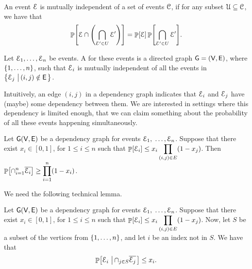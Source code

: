 \begin{defn}
    An event $\EuScript{E}$ is mutually independent of a set of events
    $\EuScript{C}$, if for any subset $\EuScript{U} \subseteq
    \EuScript{C}$, we have that
    \[
    \Prob{\Event \cap \pth{\bigcap_{\Event' \in U} \Event'}}
    =\Prob{\Event } \Prob{\bigcap_{\Event' \in U} \Event'}.
    \]
     

    Let $\EuScript{E}_1, \ldots, \EuScript{E}_n$ be events. A  for these events is a directed graph
    $\mathsf{G}=(\mathsf{V},\mathsf{E})$, where $\left\{ {1,\ldots, n} \right\}$, such that
    $\EuScript{E}_i$ is mutually independent of all the events in $\left\{ {
       \EuScript{E}_j \,\left|\, { (i,j) \notin \mathsf{E}} \bigr.\right.} \right\}$.
\end{defn}

Intuitively, an edge $(i,j)$ in a dependency graph indicates that
$\EuScript{E}_i$ and $\EuScript{E}_j$ have (maybe) some dependency between them.  We are
interested in settings where this dependency is limited enough, that
we can claim something about the probability of all these events
happening simultaneously.

\begin{lemma}%
    Let $\mathsf{G}(\mathsf{V},\mathsf{E})$ be a dependency graph for events
    $\EuScript{E}_1,$ $\ldots, \EuScript{E}_n$. Suppose that there exist $x_i \in
    [0,1]$, for $1 \leq i \leq n$ such that $\ds \Prob{\Event_i} \leq
    x_i \prod_{(i,j) \in E} \pth{1-x_j}$.  Then $\ds
    \Prob{\cap_{i=1}^{n} \overline{\Event_i}} \geq \prod_{i=1}^{n}
    \pth{1-x_i}$.
\end{lemma}

We need the following technical lemma.

\begin{lemma}
    Let $\mathsf{G}(\mathsf{V},\mathsf{E})$ be a dependency graph for events
    $\EuScript{E}_1,$ $\ldots, \EuScript{E}_n$. Suppose that there exist $x_i \in
    [0,1]$, for $1 \leq i \leq n$ such that $\ds \Prob{\Event_i} \leq
    x_i \prod_{(i,j) \in E} \pth{1-x_j}$.  Now, let $S$ be a subset of
    the vertices from $\left\{ {1, \ldots, n} \right\}$, and let $i$ be an index
    not in $S$.  We have that
    \begin{align}
        \Prob{\Event_i \sep{ \cap_{j \in S} \overline{\Event_j}}} \leq
        x_i.        
        \eqlab{ind}
    \end{align}
\end{lemma}


